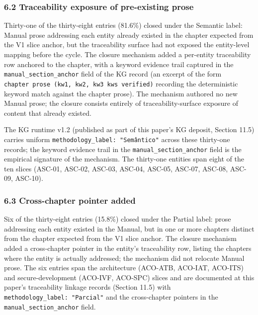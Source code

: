 \documentclass[
]{article}
\begin{document}
\subsubsection{6.2 Traceability exposure of pre-existing
prose}\label{traceability-exposure-of-pre-existing-prose}

Thirty-one of the thirty-eight entries (81.6\%) closed under the
Semantic label: Manual prose addressing each entity already existed in
the chapter expected from the V1 slice anchor, but the traceability
surface had not exposed the entity-level mapping before the cycle. The
closure mechanism added a per-entity traceability row anchored to the
chapter, with a keyword evidence trail captured in the
\texttt{manual\_section\_anchor} field of the KG record (an excerpt of
the form \texttt{chapter\ prose\ (kw1,\ kw2,\ kw3\ kws\ verified)}
recording the deterministic keyword match against the chapter prose).
The mechanism authored no new Manual prose; the closure consists
entirely of traceability-surface exposure of content that already
existed.

The KG runtime v1.2 (published as part of this paper's KG deposit,
Section 11.5) carries uniform \texttt{methodology\_label:\ "Semântico"}
across these thirty-one records; the keyword evidence trail in the
\texttt{manual\_section\_anchor} field is the empirical signature of the
mechanism. The thirty-one entities span eight of the ten slices (ASC-01,
ASC-02, ASC-03, ASC-04, ASC-05, ASC-07, ASC-08, ASC-09, ASC-10).

\subsubsection{6.3 Cross-chapter pointer
added}\label{cross-chapter-pointer-added}

Six of the thirty-eight entries (15.8\%) closed under the Partial label:
prose addressing each entity existed in the Manual, but in one or more
chapters distinct from the chapter expected from the V1 slice anchor.
The closure mechanism added a cross-chapter pointer in the entity's
traceability row, listing the chapters where the entity is actually
addressed; the mechanism did not relocate Manual prose. The six entries
span the architecture (ACO-ATB, ACO-IAT, ACO-ITS) and secure-development
(ACO-IVF, ACO-SPC) slices and are documented at this paper's
traceability linkage records (Section 11.5) with
\texttt{methodology\_label:\ "Parcial"} and the cross-chapter pointers
in the \texttt{manual\_section\_anchor} field.
\end{document}
